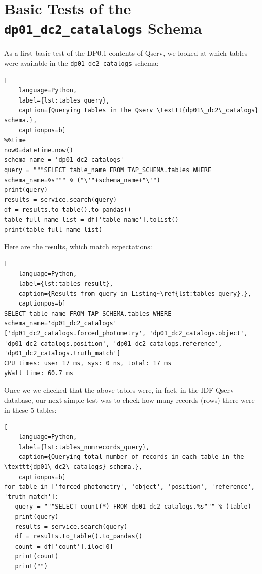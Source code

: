 \documentclass[DM,authoryear,toc]{lsstdoc}
\begin{document}
\section{Basic Tests of the \texttt{dp01\_dc2\_catalalogs} Schema} \label{sec:basic}

As a first basic test of the DP0.1 contents of Qserv, we looked at which tables were available in the
\texttt{dp01\_dc2\_catalogs} schema:

\begin{lstlisting}[
    language=Python,
    label={lst:tables_query},
    caption={Querying tables in the Qserv \texttt{dp01\_dc2\_catalogs} schema.},
    captionpos=b]
%%time
now0=datetime.now()
schema_name = 'dp01_dc2_catalogs'
query = """SELECT table_name FROM TAP_SCHEMA.tables WHERE schema_name=%s""" % ("\'"+schema_name+"\'")
print(query)
results = service.search(query)
df = results.to_table().to_pandas()
table_full_name_list = df['table_name'].tolist()
print(table_full_name_list)
\end{lstlisting}

Here are the results, which match expectations:

\begin{lstlisting}[
    language=Python,
    label={lst:tables_result},
    caption={Results from query in Listing~\ref{lst:tables_query}.},
    captionpos=b]
SELECT table_name FROM TAP_SCHEMA.tables WHERE schema_name='dp01_dc2_catalogs'
['dp01_dc2_catalogs.forced_photometry', 'dp01_dc2_catalogs.object', 'dp01_dc2_catalogs.position', 'dp01_dc2_catalogs.reference', 'dp01_dc2_catalogs.truth_match']
CPU times: user 17 ms, sys: 0 ns, total: 17 ms
yWall time: 60.7 ms
\end{lstlisting}


Once we we checked that the above tables were, in fact, in the IDF Qserv database, our next simple test was to check how many records (rows) there were in these 5 tables: 

\begin{lstlisting}[
    language=Python,
    label={lst:tables_numrecords_query},
    caption={Querying total number of records in each table in the \texttt{dp01\_dc2\_catalogs} schema.},
    captionpos=b]
for table in ['forced_photometry', 'object', 'position', 'reference', 'truth_match']:
   query = """SELECT count(*) FROM dp01_dc2_catalogs.%s""" % (table)
   print(query)
   results = service.search(query)
   df = results.to_table().to_pandas()
   count = df['count'].iloc[0]
   print(count)
   print("")
\end{lstlisting}
\end{document}
